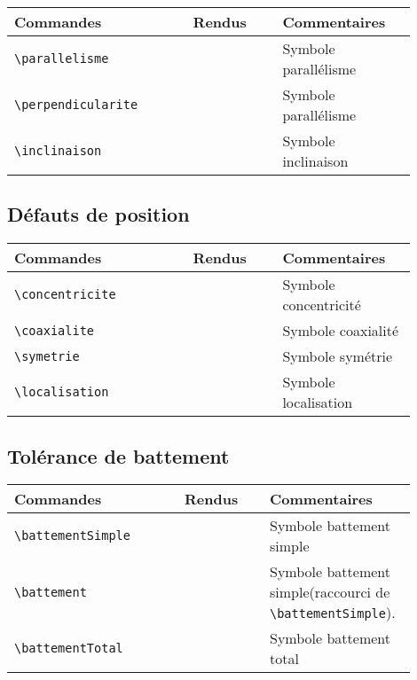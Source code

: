 \documentclass[a4paper,12pt]{article}
\begin{document}
			\noindent
			\begin{tabular}{|p{0.4\linewidth}|p{0.2\linewidth}|p{0.3\linewidth}|}
				\hline
					\textbf{Commandes}&\textbf{Rendus}&\textbf{Commentaires}
				\\\hline\hline
					\verb!\parallelisme!	&	\parallelisme	&	Symbole parallélisme
				\\\hline
					\verb!\perpendicularite!&	\perpendicularite&	Symbole parallélisme
				\\\hline
					\verb!\inclinaison!	&	\inclinaison	&	Symbole inclinaison
				\\\hline
			\end{tabular}

		\subsection{Défauts de position}

			\noindent
			\begin{tabular}{|p{0.4\linewidth}|p{0.2\linewidth}|p{0.3\linewidth}|}
				\hline
					\textbf{Commandes}&\textbf{Rendus}&\textbf{Commentaires}
				\\\hline\hline
					\verb!\concentricite!	&	\concentricite	&	Symbole concentricité
				\\\hline
					\verb!\coaxialite!	&	\coaxialite	&	Symbole coaxialité
				\\\hline
					\verb!\symetrie!	&	\symetrie	&	Symbole symétrie
				\\\hline
					\verb!\localisation!	&	\localisation	&	Symbole localisation
				\\\hline
			\end{tabular}

		\subsection{Tolérance de battement}

			\noindent
			\begin{tabular}{|p{0.4\linewidth}|p{0.2\linewidth}|p{0.3\linewidth}|}
				\hline
					\textbf{Commandes}&\textbf{Rendus}&\textbf{Commentaires}
				\\\hline\hline
					\verb!\battementSimple!	&	\battementSimple	&	Symbole battement simple
				\\\hline
					\verb!\battement!	&	\battement		&	Symbole battement simple(raccourci de \verb!\battementSimple!).
				\\\hline
					\verb!\battementTotal!	&	\battementTotal		&	Symbole battement total
				\\\hline
			\end{tabular}
\end{document}
